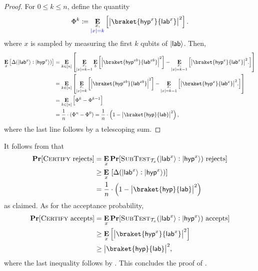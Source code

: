 \begin{proof}
    For $0\leq k \leq n$, define the quantity
    \begin{equation*}
        \Phi^k \coloneqq \mathop{\E}_{\substack{x, \\ \textcolor{blue}{|x| = k}}} \left[\abs{\braket{\tar^{x}}{\lab^{x}}}^2\right].
    \end{equation*}
    where $x$ is sampled by measuring the first $k$ qubits of $\lvert\mathsf{lab}\rangle$. Then,
    \begin{align*}
        \mathop{\E}_{x} \sbra{ \Delta(\ket{\lab^x}: \ket{\tar^x}) } &= \mathop{\E}_{k\in [n]} \sbra{ \mathop{\E}_{\substack{x, \\ |x| = k-1}}  \mathop{\E}_{b}\left[\abs{\braket{\tar^{xb}}{\lab^{xb}}}^2\right] -  \mathop{\E}_{\substack{x, \\ |x| = k-1}} \sbra{ \abs{\braket{\tar^x}{\lab^x}}^2. }}\\
        &= \mathop{\E}_{k\in [n]} \sbra{ \mathop{\E}_{\substack{x, \\ |x| = k}}  \left[\abs{\braket{\tar^{xb}}{\lab^{xb}}}^2\right] -  \mathop{\E}_{\substack{x, \\ |x| = k-1}} \sbra{ \abs{\braket{\tar^x}{\lab^x}}^2. }}\\
        &= \mathop{\E}_{k\in [n]} \sbra{ \Phi^k - \Phi^{k-1} } \\
        &= \frac{1}{n}\cdot (\Phi^n-\Phi^0) = \frac1n\cdot \left(1- \abs{\braket{\tar}{\lab}}^2 \right),
    \end{align*}
    where the last line follows by a telescoping sum.
\end{proof}

It follows from  that
\begin{align*}
    \Pr[\textsc{Certify} \text{ rejects}] &= \mathop{\E}_{x} \Pr[\textsc{SubTest}_{\calT_x}(\ket{\lab^x} : \ket{\smash{\tar^x}}) \text{ rejects}]  \\
    &\geq  \mathop{\E}_{x}\ [\Delta(\ket{\lab^{x}}: \ket{\tar^{x}})]\\
    &= \frac1n\cdot \left(1- \abs{\braket{\tar}{\lab}}^2 \right)
\end{align*}
as claimed. As for the acceptance probability,
\begin{align*}
    \Pr[\textsc{Certify} \text{ accepts}] &= \mathop{\E}_{x} \Pr[\textsc{SubTest}_{\calT_x}(\ket{\lab^x}: \ket{\smash{\tar^x}}) \text{ accepts}]  \\
    &\geq \mathop{\E}_{x} \sbra{ \abs{\braket{\tar^x}{\lab^x}}^2 }\\
    &\geq \abs{\braket{\tar}{\lab}}^2,
\end{align*}
where the last inequality follows by . This concludes the proof of .

